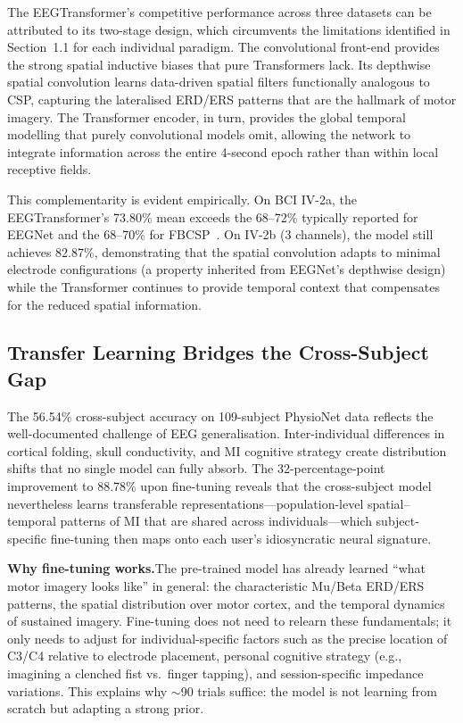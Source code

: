 \documentclass[12pt, a4paper]{article}
\begin{document}
The EEGTransformer's competitive performance across three datasets can be attributed to its two-stage design, which circumvents the limitations identified in Section~1.1 for each individual paradigm. The convolutional front-end provides the strong spatial inductive biases that pure Transformers lack. Its depthwise spatial convolution learns data-driven spatial filters functionally analogous to CSP, capturing the lateralised ERD/ERS patterns that are the hallmark of motor imagery. The Transformer encoder, in turn, provides the global temporal modelling that purely convolutional models omit, allowing the network to integrate information across the entire 4-second epoch rather than within local receptive fields.

This complementarity is evident empirically. On BCI IV-2a, the EEGTransformer's 73.80\% mean exceeds the 68--72\% typically reported for EEGNet and the 68--70\% for FBCSP~\cite{hameed2025enhancing}. On IV-2b (3 channels), the model still achieves 82.87\%, demonstrating that the spatial convolution adapts to minimal electrode configurations (a property inherited from EEGNet's depthwise design) while the Transformer continues to provide temporal context that compensates for the reduced spatial information.

\subsection{Transfer Learning Bridges the Cross-Subject Gap}

The 56.54\% cross-subject accuracy on 109-subject PhysioNet data reflects the well-documented challenge of EEG generalisation. Inter-individual differences in cortical folding, skull conductivity, and MI cognitive strategy create distribution shifts that no single model can fully absorb. The 32-percentage-point improvement to 88.78\% upon fine-tuning reveals that the cross-subject model nevertheless learns transferable representations---population-level spatial--temporal patterns of MI that are shared across individuals---which subject-specific fine-tuning then maps onto each user's idiosyncratic neural signature.

\textbf{Why fine-tuning works.}\quad The pre-trained model has already learned ``what motor imagery looks like'' in general: the characteristic Mu/Beta ERD/ERS patterns, the spatial distribution over motor cortex, and the temporal dynamics of sustained imagery. Fine-tuning does not need to relearn these fundamentals; it only needs to adjust for individual-specific factors such as the precise location of C3/C4 relative to electrode placement, personal cognitive strategy (e.g., imagining a clenched fist vs.\ finger tapping), and session-specific impedance variations. This explains why $\sim$90 trials suffice: the model is not learning from scratch but adapting a strong prior.
\end{document}
